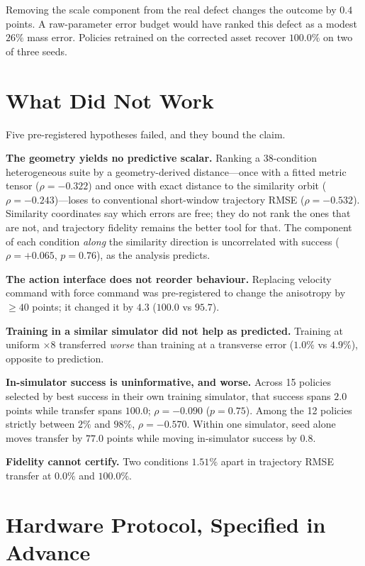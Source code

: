 \documentclass[conference]{IEEEtran}
\begin{document}
Removing the scale component from the real defect changes the outcome by $0.4$
points. A raw-parameter error budget would have ranked this defect as a modest
$26\%$ mass error. Policies retrained on the corrected asset recover $100.0\%$
on two of three seeds.

\section{What Did Not Work}\label{sec:fail}

Five pre-registered hypotheses failed, and they bound the claim.

\textbf{The geometry yields no predictive scalar.} Ranking a 38-condition
heterogeneous suite by a geometry-derived distance---once with a fitted metric
tensor ($\rho = -0.322$) and once with exact distance to the similarity orbit
($\rho = -0.243$)---loses to conventional short-window trajectory RMSE
($\rho = -0.532$). Similarity coordinates say which errors are free; they do not
rank the ones that are not, and trajectory fidelity remains the better tool for
that. The component of each condition \emph{along} the similarity direction is
uncorrelated with success ($\rho = +0.065$, $p=0.76$), as the analysis
predicts.

\textbf{The action interface does not reorder behaviour.} Replacing velocity
command with force command was pre-registered to change the anisotropy by
$\geq 40$ points; it changed it by $4.3$ ($100.0$ vs $95.7$).

\textbf{Training in a similar simulator did not help as predicted.} Training at
uniform $\times 8$ transferred \emph{worse} than training at a transverse error
($1.0\%$ vs $4.9\%$), opposite to prediction.

\textbf{In-simulator success is uninformative, and worse.} Across 15 policies
selected by best success in their own training simulator, that success spans
$2.0$ points while transfer spans $100.0$; $\rho = -0.090$ ($p=0.75$). Among the
12 policies strictly between $2\%$ and $98\%$, $\rho = -0.570$. Within one
simulator, seed alone moves transfer by $77.0$ points while moving in-simulator
success by $0.8$.

\textbf{Fidelity cannot certify.} Two conditions $1.51\%$ apart in trajectory
RMSE transfer at $0.0\%$ and $100.0\%$.

\section{Hardware Protocol, Specified in Advance}\label{sec:hw}
\end{document}
